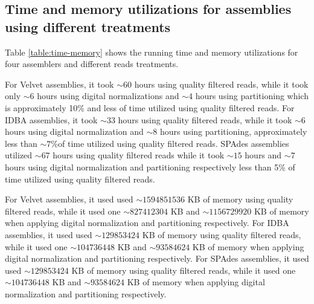 
\subsection*{Time and memory utilizations for assemblies using different treatments}
Table \ref {table:time-memory}  shows the  running time and memory utilizations for four assemblers and different reads treatments.
 

For Velvet assemblies, it  took $\sim 60$ hours using quality filtered reads, while it took only  $\sim 6$ hours using digital normalizations and  $\sim 4$ hours using partitioning which is approximately 10\% and less of time utilized using quality filtered reads.  For IDBA assemblies, it took $\sim 33$ hours using quality filtered reads, while it took $\sim 6$ hours using digital normalization and $\sim 8$ hours using partitioning, approximately less than $\sim 7\% $of time utilized using quality filtered reads. SPAdes assemblies utilized $\sim 67$ hours using quality filtered reads  while it took $\sim15$ hours and $\sim 7$ hours using digital normalization and partitioning respectively less than 5\% of time utilized using quality filtered reads.

For Velvet assemblies, it used used $\sim 1594851536 $ KB of memory using quality filtered reads, while it used one $\sim 827412304$ KB and $\sim 1156729920 $ KB of memory when applying digital normalization and partitioning respectively. For IDBA assemblies, it used used $\sim 129853424 $ KB of memory using quality filtered reads, while it used one $\sim 104736448$ KB and $\sim 93584624  $ KB of memory when applying digital normalization and partitioning respectively. For SPAdes assemblies, it used used $\sim 129853424 $ KB of memory using quality filtered reads, while it used one $\sim 104736448$ KB and $\sim 93584624  $ KB of memory when applying digital normalization and partitioning respectively. 


